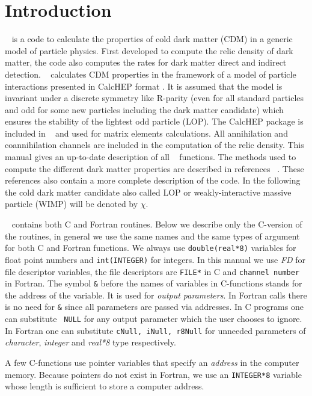 \documentclass[12pt,a4paper]{article}
\begin{document}
\section{Introduction}
\micro~ is a code 
 to calculate the properties of cold dark matter (CDM)  in a generic model of particle physics.  
 First developed to compute the relic density of dark matter, 
 the code also computes the rates for dark matter direct and  indirect detection. 
 \micro~ calculates CDM properties in the framework of a model of particle
 interactions presented in CalcHEP format \cite{Pukhov:2004ca}. 
 It is assumed that the model is invariant under  a discrete symmetry like R-parity (even for 
all standard particles and odd for some new particles including the dark matter candidate) which ensures 
the stability of the lightest  odd particle (LOP).  The CalcHEP
 package is included in \micro~ and used for matrix elements calculations.
All annihilation and coannihilation channels are included in the computation of the relic density. 
This manual gives an up-to-date description of all \micro~ functions.  
The methods used to compute the different dark matter properties are described 
in references 
~\cite{Belanger:2001fz,Belanger:2004yn,Belanger:2006is,Belanger:2008sj,Belanger:2010gh,Belanger:2013oya}.
These references also contain  a more complete description of the code. In the following
the cold dark matter candidate also called LOP or weakly-interactive massive particle (WIMP)
will be denoted by $\chi$. 

\micro~ contains both C and Fortran routines. Below we describe only the
C-version of the routines,  in general we use the same  names
 and the same types of argument for both  C and Fortran functions. 
We always use \verb|double(real*8)| variables for float point numbers and 
\verb|int(INTEGER)| for integers. In this manual we use {\it FD} for  file descriptor 
variables, the file descriptors  are  \verb|FILE*| in C and {\tt channel number} in Fortran. 
The symbol \verb|&| before the names of variables in C-functions stands for 
the address of the variable. It is used for  {\it output
parameters}. In Fortran calls there is no need for \verb|&|
since  all parameters are passed via addresses. In C programs one  can substitute {\tt
NULL} for any output parameter which the user chooses to ignore. In Fortran  one
can substitute {\tt cNull, iNull, r8Null} for unneeded
parameters of  {\it character}, {\it integer}  and {\it real*8}  type respectively.  

A few C-functions use pointer variables that specify an {\it address} in 
the computer memory. Because pointers do not exist in  Fortran,
  we use  an {\tt INTEGER*8} variable  whose length is sufficient to store a computer address.
\end{document}
